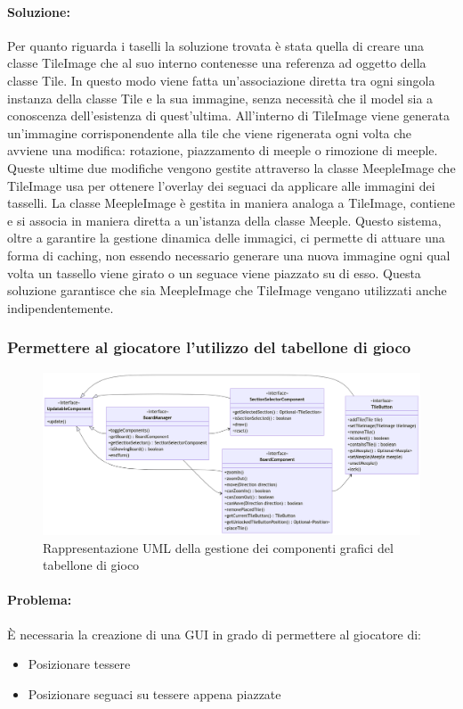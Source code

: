 \paragraph{Soluzione:}
Per quanto riguarda i taselli la soluzione trovata è stata quella di creare una classe TileImage che al suo interno contenesse una referenza ad oggetto della classe Tile. In questo modo viene fatta un'associazione diretta tra ogni singola instanza della classe Tile e la sua immagine, senza necessità che il model sia a conoscenza dell'esistenza di quest'ultima. All'interno di TileImage viene generata un'immagine corrisponendente alla tile che viene rigenerata ogni volta che avviene una modifica: rotazione, piazzamento di meeple o rimozione di meeple. Queste ultime due modifiche vengono gestite attraverso la classe MeepleImage che TileImage usa per ottenere l'overlay dei seguaci da applicare alle immagini dei tasselli. La classe MeepleImage è gestita in maniera analoga a TileImage, contiene e si associa in maniera diretta a un'istanza della classe Meeple. Questo sistema, oltre a garantire la gestione dinamica delle immagici, ci permette di attuare una forma di caching, non essendo necessario generare una nuova immagine ogni qual volta un tassello viene girato o un seguace viene piazzato su di esso. Questa soluzione garantisce che sia MeepleImage che TileImage vengano utilizzati anche indipendentemente.

\subsubsection*{Permettere al giocatore l'utilizzo del tabellone di gioco}
\begin{figure}[h]
    \centering\includegraphics[scale=.3]{images/uml_board.png}
    \caption{Rappresentazione UML della gestione dei componenti grafici del tabellone di gioco}
\end{figure}
\paragraph{Problema:}
È necessaria la creazione di una GUI in grado di permettere al giocatore di:
\begin{itemize}
    \item Posizionare tessere
    \item Posizionare seguaci su tessere appena piazzate
\end{itemize}
